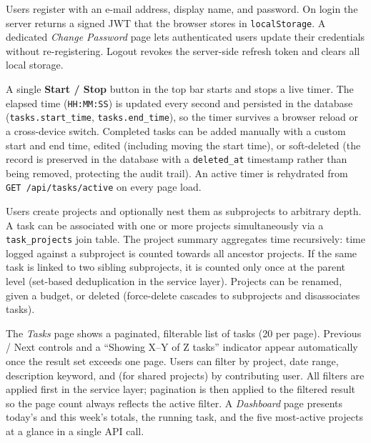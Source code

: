 \documentclass[a4paper, 12pt]{article}
\begin{document}
\begin{description}[leftmargin=0pt]

  \item[User Management.]
    Users register with an e-mail address, display name, and password. On login the server
    returns a signed JWT that the browser stores in \texttt{localStorage}. A dedicated
    \textit{Change Password} page lets authenticated users update their credentials without
    re-registering. Logout revokes the server-side refresh token and clears all local storage.

  \item[Time Tracking.]
    A single \textbf{Start / Stop} button in the top bar starts and stops a live timer.
    The elapsed time (\texttt{HH:MM:SS}) is updated every second and persisted in the database
    (\texttt{tasks.start\_time}, \texttt{tasks.end\_time}), so the timer survives a browser
    reload or a cross-device switch. Completed tasks can be added manually with a custom start
    and end time, edited (including moving the start time), or soft-deleted (the record is
    preserved in the database with a \texttt{deleted\_at} timestamp rather than being removed,
    protecting the audit trail). An active timer is rehydrated from
    \texttt{GET /api/tasks/active} on every page load.

  \item[Projects.]
    Users create projects and optionally nest them as subprojects to arbitrary depth. A task
    can be associated with one or more projects simultaneously via a \texttt{task\_projects}
    join table. The project summary aggregates time recursively: time logged against a
    subproject is counted towards all ancestor projects. If the same task is linked to two
    sibling subprojects, it is counted only once at the parent level (set-based deduplication
    in the service layer). Projects can be renamed, given a budget, or deleted (force-delete
    cascades to subprojects and disassociates tasks).

  \item[Task Overview.]
    The \textit{Tasks} page shows a paginated, filterable list of tasks (20 per page).
    Previous / Next controls and a ``Showing X--Y of Z tasks'' indicator appear automatically
    once the result set exceeds one page. Users can filter by project, date range, description
    keyword, and (for shared projects) by contributing user. All filters are applied first in
    the service layer; pagination is then applied to the filtered result so the page count
    always reflects the active filter. A \textit{Dashboard} page presents today's and this
    week's totals, the running task, and the five most-active projects at a glance in a
    single API call.


\end{description}
\end{document}
